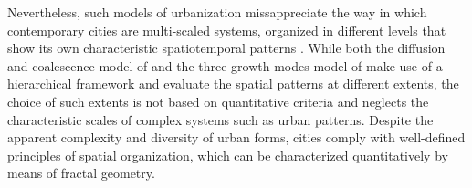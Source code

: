 Nevertheless, such models of urbanization missappreciate the way in which contemporary cities are multi-scaled systems, organized in different levels that show its own characteristic spatiotemporal patterns \citep{batty2005cities, batty2008size, white2015modeling}.
While both the diffusion and coalescence model of \cite{dietzel2005spatio} and the three growth modes model of \cite{li2013quantifying} make use of a hierarchical framework and evaluate the spatial patterns at different extents, the choice of such extents is not based on quantitative criteria and neglects the characteristic scales of complex systems such as urban patterns.
Despite the apparent complexity and diversity of urban forms, cities comply with well-defined principles of spatial organization, which can be characterized quantitatively by means of fractal geometry.
